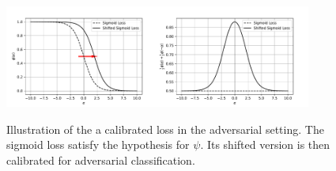     



\begin{figure}
    \centering
    \includegraphics[width = 0.45\textwidth]{sections/3_calibration/images/calibrated_loss.pdf}\includegraphics[width = 0.45\textwidth]{sections/3_calibration/images/calibrated_loss_ass.pdf}
    \caption{Illustration of the a calibrated loss in the adversarial setting. The sigmoid loss satisfy the hypothesis for $\psi$. Its shifted version is then calibrated for adversarial classification.}
    \label{fig:cal}
\end{figure}





